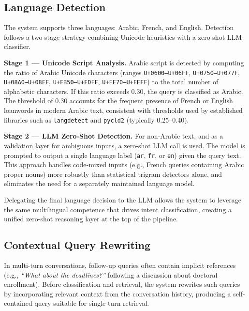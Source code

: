 \documentclass[12pt, a4paper]{article}
\begin{document}
\subsection{Language Detection}

The system supports three languages: Arabic, French, and English.
Detection follows a two-stage strategy combining Unicode heuristics with
a zero-shot LLM classifier.

\textbf{Stage 1 --- Unicode Script Analysis.}
Arabic script is detected by computing the ratio of Arabic Unicode characters
(ranges \texttt{U+0600--U+06FF}, \texttt{U+0750--U+077F}, \texttt{U+08A0--U+08FF},
\texttt{U+FB50--U+FDFF}, \texttt{U+FE70--U+FEFF}) to the total number of
alphabetic characters. If this ratio exceeds $0.30$, the query is classified
as Arabic. The threshold of $0.30$ accounts for the frequent presence of French
or English loanwords in modern Arabic text, consistent with thresholds used by
established libraries such as \texttt{langdetect} and \texttt{pycld2}
(typically $0.25$--$0.40$).

\textbf{Stage 2 --- LLM Zero-Shot Detection.}
For non-Arabic text, and as a validation layer for ambiguous inputs, a zero-shot
LLM call is used. The model is prompted to output a single language label
(\texttt{ar}, \texttt{fr}, or \texttt{en}) given the query text. This approach
handles code-mixed inputs (e.g., French queries containing Arabic proper nouns)
more robustly than statistical trigram detectors alone, and eliminates the need
for a separately maintained language model.

\begin{notebox}
Delegating the final language decision to the LLM allows the system to leverage
the same multilingual competence that drives intent classification, creating a
unified zero-shot reasoning layer at the top of the pipeline.
\end{notebox}

\subsection{Contextual Query Rewriting}

In multi-turn conversations, follow-up queries often contain implicit references
(e.g., \textit{``What about the deadlines?''} following a discussion about doctoral
enrollment). Before classification and retrieval, the system rewrites such queries
by incorporating relevant context from the conversation history, producing a
self-contained query suitable for single-turn retrieval.
\end{document}

